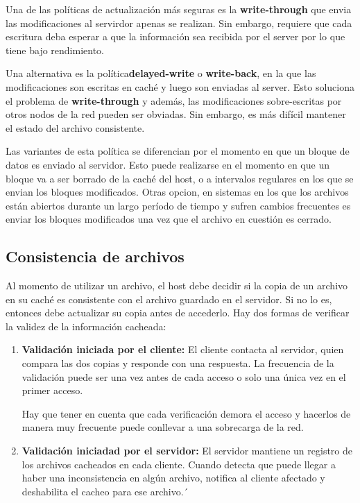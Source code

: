 Una de las políticas de actualización más seguras es la \textbf{write-through} que envia las modificaciones al servirdor apenas se realizan. Sin embargo, requiere que cada escritura deba esperar a que la información sea recibida por el server por lo que tiene bajo rendimiento.

Una alternativa es la política\textbf{delayed-write} o \textbf{write-back}, en la que las modificaciones son escritas en caché y luego son enviadas al server. Esto soluciona el problema de \textbf{write-through} y además, las modificaciones sobre-escritas por otros nodos de la red pueden ser obviadas. Sin embargo, es más difícil mantener el estado del archivo consistente.

Las variantes de esta política se diferencian por el momento en que un bloque de datos es enviado al servidor. Esto puede realizarse en el momento en que un bloque va a ser borrado de la  caché del host, o a intervalos regulares en los que se envian los bloques modificados. Otras opcion, en sistemas en los que los archivos están abiertos durante un largo período de tiempo y sufren cambios frecuentes es enviar los bloques modificados una vez que el archivo en cuestión es cerrado.

\subsection*{Consistencia de archivos}
Al momento de utilizar un archivo, el host debe decidir si la copia de un archivo en su caché es consistente con el archivo guardado en el servidor. Si no lo es, entonces debe actualizar su copia antes de accederlo. Hay dos formas de verificar la validez de la información cacheada:
\begin{enumerate}
	\item \textbf{Validación iniciada por el cliente:} El cliente contacta al servidor, quien compara las dos copias y responde con una respuesta. La frecuencia de la validación puede ser una vez antes de cada acceso o solo una única vez en el primer acceso.
	
	Hay que tener en cuenta que cada verificación demora el acceso y hacerlos de manera muy frecuente puede conllevar a una sobrecarga de la red.
	
	\item \textbf{Validación iniciadad por el servidor:} El servidor mantiene un registro de los archivos cacheados en cada cliente. Cuando detecta que puede llegar a haber una inconsistencia en algún archivo, notifica al cliente afectado y deshabilita el cacheo para ese archivo.´
\end{enumerate}
\newpage
